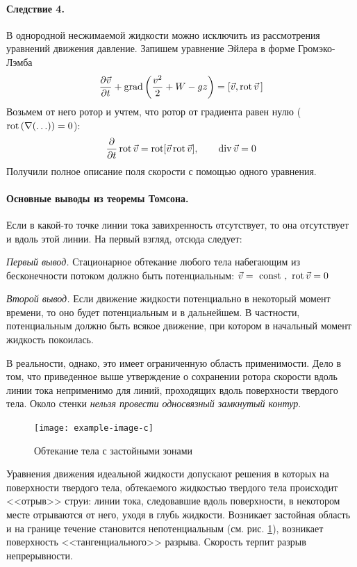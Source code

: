 \paragraph{Следствие 4.} 

В однородной несжимаемой жидкости можно исключить из рассмотрения уравнений движения давление.  Запишем уравнение Эйлера в форме Громэко-Лэмба
\begin{equation}
	\frac { \partial \vec{v} } { \partial t } +\operatorname{grad} \left( \frac { v ^ { 2 } } { 2 } + W - g z \right) = [ \vec{v} , \operatorname{rot} \vec{v}\,]
\end{equation}
Возьмем от него ротор и учтем, что ротор от градиента равен нулю ($\operatorname{rot}\qty(\nabla \qty(\ldots))= 0 $):
\begin{align*}
{ \pdv{t} \operatorname{rot}\vec{v} = \operatorname{rot}[ \vec{v} \operatorname{rot}\vec{v} ] }, \qquad
{\operatorname{div}\vec{v} = 0 }
\end{align*}
Получили полное описание поля скорости с помощью одного уравнения.


\paragraph{Основные выводы из теоремы Томсона.} Если в какой-то точке линии тока завихренность отсутствует, то она отсутствует и вдоль этой линии. На первый взгляд, отсюда следует:

\vspace{0.5em}
\textit{Первый вывод.} Стационарное обтекание любого тела набегающим из бесконечности потоком должно быть потенциальным: $\vec{v} = \text { const }, \,\,\operatorname{rot}\vec{v} = 0$
\vspace{0.5em}

\textit{Второй вывод.} Если движение жидкости потенциально в некоторый момент времени, то оно будет потенциальным и в дальнейшем. В частности, потенциальным должно быть всякое движение, при котором в начальный момент жидкость покоилась. 
\vspace{0.5em}

В реальности, однако, это имеет ограниченную область применимости. Дело в том, что приведенное выше утверждение о сохранении ротора скорости вдоль линии тока неприменимо для линий, проходящих вдоль поверхности твердого тела. Около стенки \textit{нельзя провести односвязный замкнутый контур}. 
\begin{figure}[H]
	\centering
	\texttt{[image: example-image-c]}
	\caption{Обтекание тела с застойными зонами}
	\label{fig:figure14}
\end{figure}
Уравнения движения идеальной жидкости допускают решения в которых на поверхности твердого тела, обтекаемого жидкостью твердого тела происходит <<отрыв>> струи: линии тока, следовавшие вдоль поверхности, в некотором месте отрываются от него, уходя в глубь жидкости. Возникает застойная область и на границе течение становится непотенциальным (см. рис. \ref{fig:figure14}), возникает поверхность <<тангенциального>> разрыва. Скорость терпит разрыв непрерывности.



